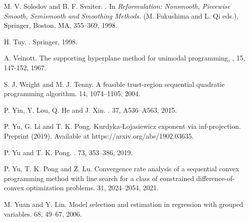 \documentclass[10pt]{article}
\numberwithin{equation}{section}
\begin{document}
\begin{thebibliography}{99}
M. V. Solodov and B. F. Svaiter.
.
\newblock In {\em Reformulation: Nonsmooth, Piecewise Smooth, Semismooth and Smoothing Methods.} (M. Fukushima and L. Qi eds.), Springer, Boston, MA, 355--369, 1998.

H. Tuy.
.
\newblock Springer, 1998.


{\color{blue} A. Veinott.
\newblock The supporting hyperplane method for unimodal programming,
, 15, 147-152, 1967.}

S. J. Wright and M. J. Tenny.
\newblock A feasible trust-region sequential quadratic programming algorithm.
 14, 1074--1105, 2004.

P. Yin, Y. Lou, Q. He and J. Xin.
.
 37, A536--A563, 2015.

P. Yu, G. Li and T. K. Pong.
\newblock Kurdyka-{\L}ojasiewicz exponent via inf-projection.
\newblock Preprint (2019). Available at https://arxiv.org/abs/1902.03635.

P. Yu and T. K. Pong.
.
 73, 353--386, 2019.

{\color{blue}
P. Yu,  T. K. Pong and Z. Lu.
\newblock Convergence rate analysis of a sequential convex programming method with line search for a class of constrained difference-of-convex optimization problems.
 31, 2024--2054, 2021.}

M. Yuan and Y. Lin.
\newblock Model selection and estimation in regression with grouped variables.
 68, 49--67, 2006.



\end{thebibliography}
\end{document}
